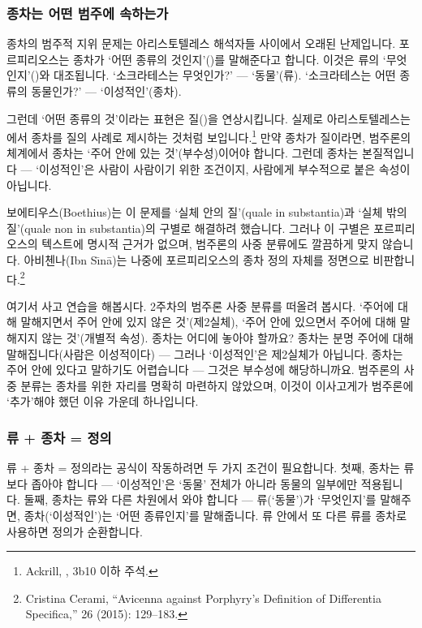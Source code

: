 \documentclass[12pt, a4paper]{article}
\begin{document}
\subsubsection{종차는 어떤 범주에 속하는가}

종차의 범주적 지위 문제는 아리스토텔레스 해석자들 사이에서 오래된 난제입니다. 포르피리오스는 종차가 `어떤 종류의 것인지'()를 말해준다고 합니다. 이것은 류의 `무엇인지'()와 대조됩니다. `소크라테스는 무엇인가?' --- `동물'(류). `소크라테스는 어떤 종류의 동물인가?' --- `이성적인'(종차).

그런데 `어떤 종류의 것'이라는 표현은 질()을 연상시킵니다. 실제로 아리스토텔레스는 에서 종차를 질의 사례로 제시하는 것처럼 보입니다.\footnote{Ackrill, , 3b10 이하 주석.} 만약 종차가 질이라면, 범주론의 체계에서 종차는 `주어 안에 있는 것'(부수성)이어야 합니다. 그런데 종차는 본질적입니다 --- `이성적인'은 사람이 사람이기 위한 조건이지, 사람에게 부수적으로 붙은 속성이 아닙니다.

보에티우스(Boethius)는 이 문제를 `실체 안의 질'(quale in substantia)과 `실체 밖의 질'(quale non in substantia)의 구별로 해결하려 했습니다. 그러나 이 구별은 포르피리오스의 텍스트에 명시적 근거가 없으며, 범주론의 사중 분류에도 깔끔하게 맞지 않습니다. 아비첸나(Ibn S\={\i}n\=a)는 나중에 포르피리오스의 종차 정의 자체를 정면으로 비판합니다.\footnote{Cristina Cerami, ``Avicenna against Porphyry's Definition of Differentia Specifica,''  26 (2015): 129--183.}

여기서 사고 연습을 해봅시다. 2주차의 범주론 사중 분류를 떠올려 봅시다. `주어에 대해 말해지면서 주어 안에 있지 않은 것'(제2실체), `주어 안에 있으면서 주어에 대해 말해지지 않는 것'(개별적 속성). 종차는 어디에 놓아야 할까요? 종차는 분명 주어에 대해 말해집니다(사람은 이성적이다) --- 그러나 `이성적인'은 제2실체가 아닙니다. 종차는 주어 안에 있다고 말하기도 어렵습니다 --- 그것은 부수성에 해당하니까요. 범주론의 사중 분류는 종차를 위한 자리를 명확히 마련하지 않았으며, 이것이 이사고게가 범주론에 `추가'해야 했던 이유 가운데 하나입니다.

\subsubsection{류 + 종차 = 정의}

류 + 종차 = 정의라는 공식이 작동하려면 두 가지 조건이 필요합니다. 첫째, 종차는 류보다 좁아야 합니다 --- `이성적인'은 `동물' 전체가 아니라 동물의 일부에만 적용됩니다. 둘째, 종차는 류와 다른 차원에서 와야 합니다 --- 류(`동물')가 `무엇인지'를 말해주면, 종차(`이성적인')는 `어떤 종류인지'를 말해줍니다. 류 안에서 또 다른 류를 종차로 사용하면 정의가 순환합니다.
\end{document}
